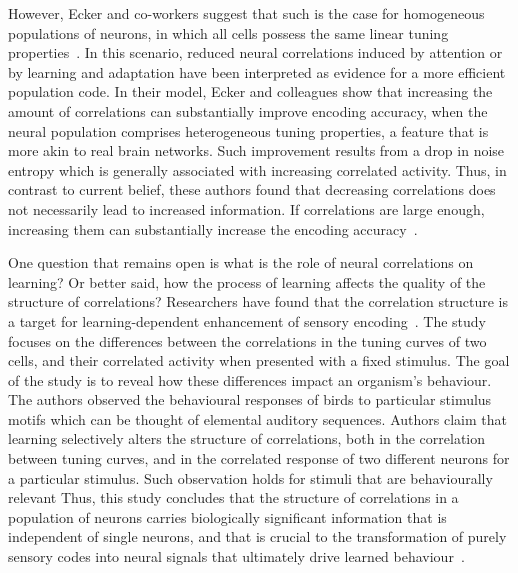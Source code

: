 \documentclass[11pt,letterpaper]{article}
\begin{document}
        However, Ecker and co-workers suggest that
        such is the case for homogeneous populations of neurons, in which
        all cells possess the same linear tuning properties~\cite{ecker2011effect}.
        In this scenario, reduced neural correlations induced by attention
        or by learning and adaptation have been interpreted as evidence
        for a more efficient population code.
        In their model, Ecker and colleagues show that increasing the amount
        of correlations can substantially improve encoding accuracy,
        when the neural population comprises heterogeneous tuning properties,
        a feature that is more akin to real brain networks.
        Such improvement results from a drop in noise entropy which is generally
        associated with increasing correlated activity.
        Thus, in contrast to current belief, these authors found that
        decreasing correlations does not necessarily lead to increased
        information.
        If correlations are large enough, increasing them can substantially
        increase the encoding accuracy~\cite{ecker2011effect}.
        
        One question that remains open is what is the role of neural correlations on learning? 
        Or better said, how the process
        of learning affects the quality of the structure of correlations?
        Researchers have found that the correlation structure is a target for
        learning-dependent enhancement of sensory encoding~\cite{jeanne2013associative}.
        The study focuses on the differences between the correlations in the tuning curves
        of two cells, and their correlated activity when presented with a fixed stimulus.
        The goal of the study is to reveal how these differences impact an organism's
        behaviour.
        The authors observed the behavioural responses of birds to particular stimulus motifs
        which can be thought of elemental auditory sequences.
        Authors claim that learning selectively alters the structure of correlations,
        both in the correlation between tuning curves, and in the correlated response
        of two different neurons for a particular stimulus.
        Such observation holds for stimuli that are behaviourally relevant
        Thus, this study concludes that the structure of correlations in a population of
        neurons carries biologically significant information that is independent of
        single neurons, and that is crucial to the transformation of purely sensory codes
        into neural signals that ultimately drive learned behaviour~\cite{jeanne2013associative}.
        
\end{document}
